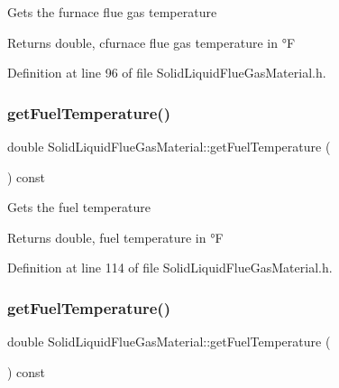 Gets the furnace flue gas temperature \begin{DoxyReturn}{Returns}
double, cfurnace flue gas temperature in °F 
\end{DoxyReturn}


Definition at line 96 of file Solid\+Liquid\+Flue\+Gas\+Material.\+h.

\mbox{\label{class_solid_liquid_flue_gas_material_a629ecc7104b6bfbb696d9478c4b48e7a}} 
\subsubsection{\texorpdfstring{get\+Fuel\+Temperature()}{getFuelTemperature()}\hspace{0.1cm}{\footnotesize\ttfamily [1/3]}}
{\footnotesize\ttfamily double Solid\+Liquid\+Flue\+Gas\+Material\+::get\+Fuel\+Temperature (\begin{DoxyParamCaption}{ }\end{DoxyParamCaption}) const\hspace{0.3cm}{\ttfamily [inline]}}

Gets the fuel temperature \begin{DoxyReturn}{Returns}
double, fuel temperature in °F 
\end{DoxyReturn}


Definition at line 114 of file Solid\+Liquid\+Flue\+Gas\+Material.\+h.

\mbox{\label{class_solid_liquid_flue_gas_material_a629ecc7104b6bfbb696d9478c4b48e7a}} 
\subsubsection{\texorpdfstring{get\+Fuel\+Temperature()}{getFuelTemperature()}\hspace{0.1cm}{\footnotesize\ttfamily [2/3]}}
{\footnotesize\ttfamily double Solid\+Liquid\+Flue\+Gas\+Material\+::get\+Fuel\+Temperature (\begin{DoxyParamCaption}{ }\end{DoxyParamCaption}) const\hspace{0.3cm}{\ttfamily [inline]}}

